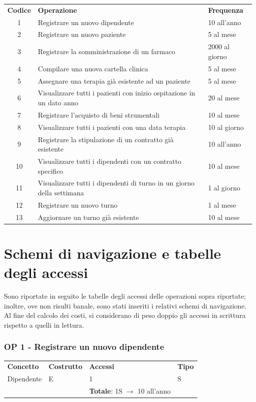 \documentclass[a4paper, 12pt]{report}
\begin{document}
\renewcommand{\arraystretch}{1.2}
\begin{tabularx}{\textwidth}{cXl}
        \rowcolor{seaGreen}
        \textbf{Codice} & \textbf{Operazione} & \textbf{Frequenza} \\
        1 & Registrare un nuovo dipendente & 10 all'anno \\
        \hline
        2 & Registrare un nuovo paziente & 5 al mese \\
        \hline
        3 & Registrare la somministrazione di un farmaco & 2000 al giorno \\
        \hline
        4 & Compilare una nuova cartella clinica & 5 al mese \\
        \hline
        5 & Assegnare una terapia già esistente ad un paziente & 5 al mese \\
        \hline
        6 & Visualizzare tutti i pazienti con inizio ospitazione in un dato anno & 20 al mese \\
        \hline
        7 & Registrare l'acquisto di beni strumentali & 10 al mese \\
        \hline
        8 & Visualizzare tutti i pazienti con una data terapia & 10 al giorno \\
        \hline
        9 & Registrare la stipulazione di un contratto già esistente & 10 all'anno \\
        \hline
        10 & Visualizzare tutti i dipendenti con un contratto specifico & 10 al mese \\
        \hline
        11 & Visualizzare tutti i dipendenti di turno in un giorno della settimana & 1 al giorno \\
        \hline
        12 & Registrare un nuovo turno & 1 al mese \\
        \hline
        13 & Aggiornare un turno già esistente & 10 al mese \\
        \hline
\end{tabularx}

\section{Schemi di navigazione e tabelle degli accessi}
Sono riportate in seguito le tabelle degli accessi delle operazioni sopra riportate; inoltre, ove
non risulti banale, sono stati inseriti i relativi schemi di navigazione. Al fine del calcolo dei
costi, si considerano di peso doppio gli accessi in scrittura rispetto a quelli in lettura.

\subsubsection*{OP 1 - Registrare un nuovo dipendente}
\renewcommand{\arraystretch}{1.2}
\begin{tabularx}{\textwidth}{XlXl}
        \rowcolor{seaGreen}
        \textbf{Concetto} & \textbf{Costrutto} & \textbf{Accessi} & \textbf{Tipo} \\
        Dipendente & E & 1 & S \\
        \rowcolor{seaGreen}
         &  & \textbf{Totale}: 1S $\rightarrow$ 10 all'anno & \\
\end{tabularx}
\end{document}

